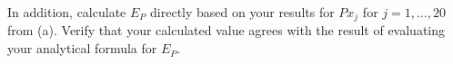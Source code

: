 \documentclass[11pt]{article}
\begin{document}
\begin{enumerate}
\begin{enumerate}
	In addition, calculate $E_P$ directly based on your results for $P x_j$
	for $j = 1, \ldots , 20$ from (a). Verify that your calculated value
	agrees with the result of evaluating your analytical formula for $E_P$.
    \end{enumerate}
\end{enumerate}
\end{document}
